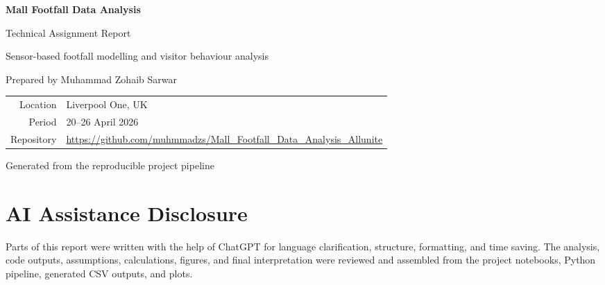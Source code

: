 \documentclass[11pt,a4paper]{article}
\newcommand{\projecttitle}{Mall Footfall Data Analysis}
\newcommand{\periodcovered}{20--26 April 2026}
\begin{document}
\begin{titlepage}
\centering
\vspace*{2.0cm}
{\Huge\bfseries \projecttitle\par}
\vspace{0.6cm}
{\Large Technical Assignment Report\par}
\vspace{1.2cm}
{\large Sensor-based footfall modelling and visitor behaviour analysis\par}
\vspace{0.8cm}
{\large Prepared by Muhammad Zohaib Sarwar\par}
\vspace{2.0cm}
\begin{tabular}{rl}
\toprule
Location & Liverpool One, UK \\
Period & \periodcovered \\
Repository & \url{https://github.com/muhmmadzs/Mall_Footfall_Data_Analysis_Allunite} \\
\bottomrule
\end{tabular}
\vfill
{\large Generated from the reproducible project pipeline\par}
\vspace*{1.0cm}
\end{titlepage}

\begin{abstract}
This report analyses one week of Wi-Fi/Bluetooth sensor detections from a shopping mall in Liverpool, UK. The assignment asks for four linked analyses: a calibrated traffic model, sensor intersection analysis, journey reconstruction, and anomaly/pattern detection. The work processes 2,248,477 raw sensor sessions, calibrates sensor detections against four one-hour manual counting windows, estimates weekly footfall, quantifies cross-sensor overlap, reconstructs sessionized visitor paths, and identifies suspicious devices and anomalous footfall hours. The delivered Task 1 estimate is Plan C, a trend-preserving clean-device elasticity model calibrated to manual counts.
\end{abstract}

\section*{AI Assistance Disclosure}
Parts of this report were written with the help of ChatGPT for language clarification, structure, formatting, and time saving. The analysis, code outputs, assumptions, calculations, figures, and final interpretation were reviewed and assembled from the project notebooks, Python pipeline, generated CSV outputs, and plots.
\end{document}
